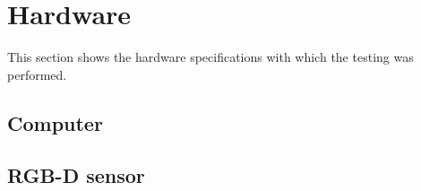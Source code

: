 \section{Hardware }
This section shows the hardware specifications with which the testing was performed. 

\subsection{Computer}

\subsection{RGB-D sensor}

